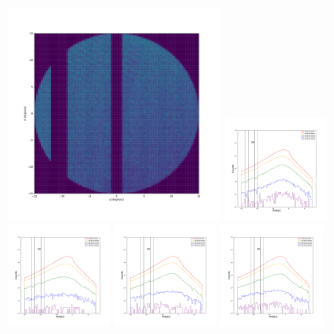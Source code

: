 \documentclass[12pt,prd]{article}
\begin{document}
\begin{figure}[h!]
\centering
\includegraphics[width=0.5\textwidth]{../figures/histogram2dgaiascan_l45_0_b82_2_ra201_5_dec28_5_npy.pdf}
\includegraphics[width=0.24\textwidth]{../figures/scanning_plotsgaiascan_l45_0_b82_2_ra201_5_dec28_5_npy_0.pdf}
\includegraphics[width=0.24\textwidth]{../figures/scanning_plotsgaiascan_l45_0_b82_2_ra201_5_dec28_5_npy_1.pdf}
\includegraphics[width=0.24\textwidth]{../figures/scanning_plotsgaiascan_l45_0_b82_2_ra201_5_dec28_5_npy_2.pdf}
\includegraphics[width=0.24\textwidth]{../figures/scanning_plotsgaiascan_l45_0_b82_2_ra201_5_dec28_5_npy_3.pdf}

\end{figure}
\end{document}

